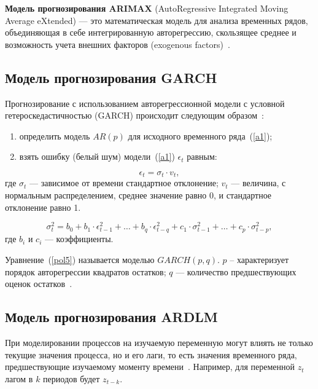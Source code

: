 \textbf{Модель прогнозирования ARIMAX} (AutoRegressive Integrated Moving Average eXtended) --- это математическая модель для анализа временных рядов,
объединяющая в себе интегрированную авторегрессию, скользящее среднее и возможность учета внешних факторов (exogenous factors)~\cite{myref9, poliref8}.

\subsection{Модель прогнозирования GARCH}
Прогнозирование с использованием авторегрессионной модели с условной гетероскедастичностью (GARCH) происходит следующим образом~\cite{myref9, poliref8}:
\begin{enumerate}
    \item определить модель $AR(p)$ для исходного временного ряда~(\ref{a1});
    \item взять ошибку (белый шум) модели~(\ref{a1}) $\epsilon_t$ равным:
\end{enumerate}

\begin{equation}
    \epsilon_t = \sigma_t \cdot v_t,
\end{equation}
где $\sigma_t$ --- зависимое от времени стандартное отклонение;
$v_t$ --- величина, с нормальным распределением, среднее значение равно 0, и стандартное отклонение равно 1.

\begin{equation}
    \label{pol5}
    \sigma_t^2 = b_0+b_1 \cdot \epsilon_{t-1}^2 + \ldots + b_q \cdot \epsilon_{t-q}^2 + c_1 \cdot \sigma_{t-1}^2 +  \ldots + c_p \cdot \sigma_{t-p}^2,
\end{equation}
где $b_i$ и $c_i$ --- коэффициенты.

Уравнение~(\ref{pol5}) называется моделью $GARCH(p, q)$.
$p$ – характеризует порядок авторегрессии квадратов остатков;
$q$ — количество предшествующих оценок остатков~\cite{myref9, poliref8}.

\subsection{Модель прогнозирования ARDLM}

При моделировании процессов на изучаемую переменную могут влиять не только текущие значения процесса, но и его лаги,
то есть значения временного ряда, предшествующие изучаемому моменту времени~\cite{myref9, poliref8}.
Например, для переменной $z_t$ лагом в $k$ периодов будет $z_{t-k}$.


